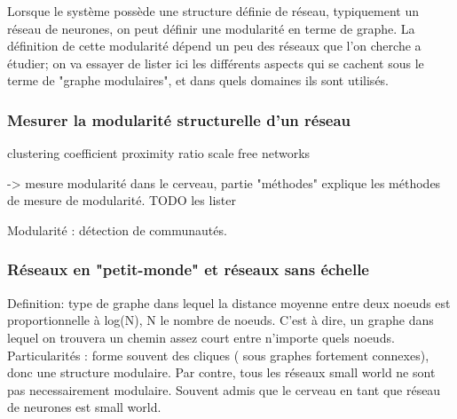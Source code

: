 Lorsque le système possède une structure définie de réseau, typiquement un réseau de neurones, on peut définir une modularité en terme de graphe. La définition de cette modularité dépend un peu des réseaux que l'on cherche a étudier; on va essayer de lister ici les différents aspects qui se cachent sous le terme de "graphe modulaires", et dans quels domaines ils sont utilisés.

\subsubsection{Mesurer la modularité structurelle d'un réseau}
clustering coefficient
proximity ratio
scale free networks

\cite{Harriger2012RichCO}-> mesure modularité dans le cerveau, partie "méthodes" explique les méthodes de mesure de modularité. TODO les lister

Modularité : détection de communautés.


\subsubsection{Réseaux en "petit-monde" et réseaux sans échelle}
Definition: type de graphe dans lequel la distance moyenne entre deux noeuds est proportionnelle à log(N), N le nombre de noeuds. C'est à dire, un graphe dans lequel on trouvera un chemin assez court entre n'importe quels noeuds. 
Particularités : forme souvent des cliques ( sous graphes fortement connexes), donc une structure modulaire. Par contre, tous les réseaux small world ne sont pas necessairement modulaire. 
Souvent admis que le cerveau en tant que réseau de neurones est small world. 

